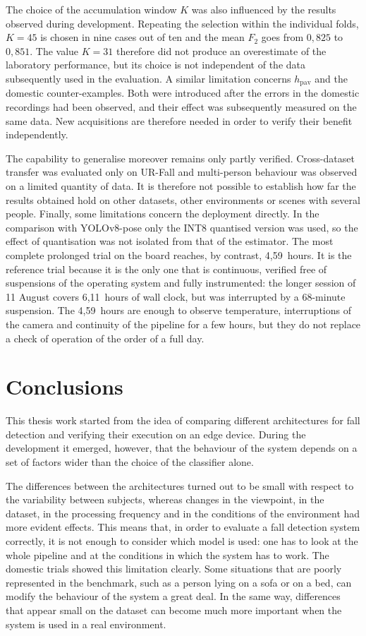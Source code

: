 The choice of the accumulation window $K$ was also influenced by the results observed during development.
Repeating the selection within the individual folds, $K=45$ is chosen in nine cases out of ten and the mean $F_2$ goes from $0{,}825$ to $0{,}851$. The value $K=31$ therefore did not produce an overestimate of the laboratory performance, but its choice is not independent of the data subsequently used in the evaluation.
A similar limitation concerns $h_{\text{pav}}$ and the domestic counter-examples. Both were introduced after the errors in the domestic recordings had been observed, and their effect was subsequently measured on the same data. New acquisitions are therefore needed in order to verify their benefit independently.

The capability to generalise moreover remains only partly verified. Cross-dataset transfer was evaluated only on UR-Fall and multi-person behaviour was observed on a limited quantity of data. It is therefore not possible to establish how far the results obtained hold on other datasets, other environments or scenes with several people.
Finally, some limitations concern the deployment directly. In the comparison with YOLOv8-pose only the INT8 quantised version was used, so the effect of quantisation was not isolated from that of the estimator. The most complete prolonged trial on the board reaches, by contrast, 4,59~hours. It is the reference trial because it is the only one that is continuous, verified free of suspensions of the operating system and fully instrumented: the longer session of 11 August covers 6,11~hours of wall clock, but was interrupted by a 68-minute suspension. The 4,59~hours are enough to observe temperature, interruptions of the camera and continuity of the pipeline for a few hours, but they do not replace a check of operation of the order of a full day.

\section{Conclusions}

This thesis work started from the idea of comparing different architectures for fall detection and verifying their execution on an edge device. During the development it emerged, however, that the behaviour of the system depends on a set of factors wider than the choice of the classifier alone.

The differences between the architectures turned out to be small with respect to the variability between subjects, whereas changes in the viewpoint, in the dataset, in the processing frequency and in the conditions of the environment had more evident effects. This means that, in order to evaluate a fall detection system correctly, it is not enough to consider which model is used: one has to look at the whole pipeline and at the conditions in which the system has to work. The domestic trials showed this limitation clearly. Some situations that are poorly represented in the benchmark, such as a person lying on a sofa or on a bed, can modify the behaviour of the system a great deal. In the same way, differences that appear small on the dataset can become much more important when the system is used in a real environment.

